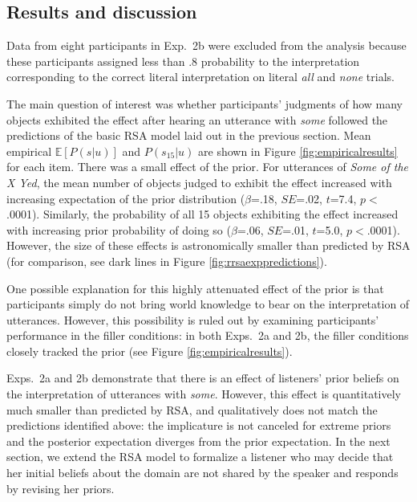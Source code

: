 \documentclass[10pt,letterpaper]{article}
\newcommand{\figref}[1]{Figure \ref{#1}}
\begin{document}
 
 \subsection{Results and discussion}

Data from eight participants in Exp.~2b were excluded from the analysis because these participants assigned less than .8 probability to the interpretation corresponding to the correct literal interpretation on literal \emph{all} and \emph{none} trials. 

The main question of interest was whether participants' judgments of how many objects exhibited the effect after hearing an utterance with \emph{some} followed the predictions of the basic RSA model laid out in the previous section. Mean empirical $\mathbb{E}[P(s|u)]$ and $P(s_{15}|u)$ are shown in \figref{fig:empiricalresults} for each item. There was a small effect of the prior. For utterances of \emph{Some of the X Yed}, the mean number of objects judged to exhibit the effect increased with increasing expectation of the prior distribution ($\beta$=.18, $SE$=.02, $t$=7.4, $p$$<$.0001). Similarly, the probability of all 15 objects exhibiting the effect increased with increasing prior probability of doing so ($\beta$=.06, $SE$=.01, $t$=5.0, $p$$<$.0001). However, the size of these effects is astronomically smaller than predicted by RSA (for comparison, see dark lines in \figref{fig:rrsaexppredictions}).%

One possible explanation for this highly attenuated effect of the prior is that participants simply do not bring world knowledge to bear on the interpretation of utterances. However, this possibility is ruled out by examining participants' performance in the filler conditions: in both Exps.~2a and 2b, the filler conditions closely tracked the prior (see \figref{fig:empiricalresults}). 

Exps.~2a and 2b demonstrate that there is an effect of listeners' prior beliefs on the interpretation of utterances with \emph{some}. However, this effect is quantitatively much smaller than predicted by RSA, and qualitatively does not match the predictions identified above: the implicature is not canceled for extreme priors and the posterior expectation diverges from the prior expectation.
In the next section, we extend the RSA model to formalize a listener who may decide that her initial beliefs about the domain are not shared by the speaker and responds by revising her priors.
\end{document}

